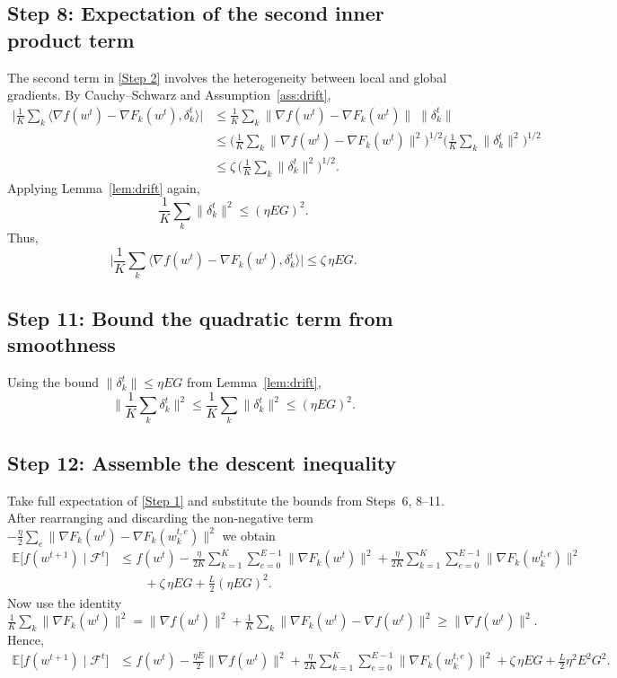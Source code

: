 \documentclass{article}
\newcommand{\E}{\mathbb{E}}
\begin{document}
\subsection*{Step 8: Expectation of the second inner product term}
The second term in \eqref{Step 2} involves the heterogeneity between local and global gradients. By Cauchy–Schwarz and Assumption~\ref{ass:drift},
\begin{align}
\Big|\frac{1}{K}\sum_{k}\big\langle\nabla f(w^{t})-\nabla F_k(w^{t}),\delta_k^{t}\big\rangle\Big|
&\le \frac{1}{K}\sum_{k}\|\nabla f(w^{t})-\nabla F_k(w^{t})\|\;\|\delta_k^{t}\| \nonumber\\
&\le \Big(\frac{1}{K}\sum_{k}\|\nabla f(w^{t})-\nabla F_k(w^{t})\|^{2}\Big)^{\!1/2}
     \Big(\frac{1}{K}\sum_{k}\|\delta_k^{t}\|^{2}\Big)^{\!1/2} \nonumber\\
&\le \zeta\,\Big(\frac{1}{K}\sum_{k}\|\delta_k^{t}\|^{2}\Big)^{\!1/2}. \tag{Step 8}
\end{align}
Applying Lemma~\ref{lem:drift} again,
\[
\frac{1}{K}\sum_{k}\|\delta_k^{t}\|^{2}\le (\eta E G)^{2}. \tag{Step 9}
\]
Thus,
\[
\Big|\frac{1}{K}\sum_{k}\big\langle\nabla f(w^{t})-\nabla F_k(w^{t}),\delta_k^{t}\big\rangle\Big|
\le \zeta\,\eta E G . \tag{Step 10}
\]

\subsection*{Step 11: Bound the quadratic term from smoothness}
Using the bound $\|\delta_k^{t}\|\le \eta E G$ from Lemma~\ref{lem:drift},
\[
\Big\|\frac{1}{K}\sum_{k}\delta_k^{t}\Big\|^{2}
\le \frac{1}{K}\sum_{k}\|\delta_k^{t}\|^{2}
\le (\eta E G)^{2}. \tag{Step 11}
\]

\subsection*{Step 12: Assemble the descent inequality}
Take full expectation of \eqref{Step 1} and substitute the bounds from Steps~6, 8–11.
After rearranging and discarding the non‑negative term $-\frac{\eta}{2}\sum_{e}\|\nabla F_k(w^{t})-\nabla F_k(w_{k}^{t,e})\|^{2}$ we obtain
\begin{align}
\E\!\big[f(w^{t+1})\mid\mathcal{F}^{t}\big]
&\le f(w^{t})
   -\frac{\eta}{2K}\sum_{k=1}^{K}\sum_{e=0}^{E-1}\|\nabla F_k(w^{t})\|^{2}
   +\frac{\eta}{2K}\sum_{k=1}^{K}\sum_{e=0}^{E-1}\|\nabla F_k(w_{k}^{t,e})\|^{2} \nonumber\\
&\qquad +\zeta\,\eta E G
   +\frac{L}{2}(\eta E G)^{2}. \tag{Step 12}
\end{align}
Now use the identity $\frac{1}{K}\sum_{k}\|\nabla F_k(w^{t})\|^{2}
= \|\nabla f(w^{t})\|^{2}+\frac{1}{K}\sum_{k}\|\nabla F_k(w^{t})-\nabla f(w^{t})\|^{2}
\ge \|\nabla f(w^{t})\|^{2}.$ Hence,
\begin{align}
\E\!\big[f(w^{t+1})\mid\mathcal{F}^{t}\big]
&\le f(w^{t})
   -\frac{\eta E}{2}\|\nabla f(w^{t})\|^{2}
   +\frac{\eta}{2K}\sum_{k=1}^{K}\sum_{e=0}^{E-1}\|\nabla F_k(w_{k}^{t,e})\|^{2}
   +\zeta\,\eta E G
   +\frac{L}{2}\eta^{2}E^{2}G^{2}. \tag{Step 13}
\end{align}
\end{document}
